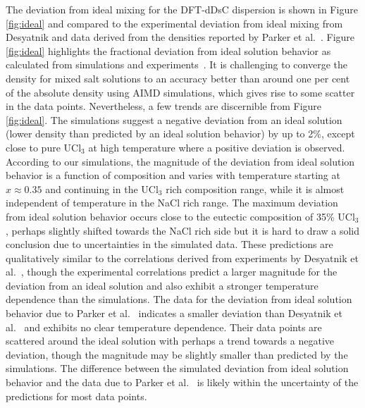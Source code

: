 \documentclass[preprint,3p,10pt,onecolumn,number,sort&compress]{elsarticle}
\begin{document}
{The deviation from ideal mixing for the DFT-dDsC dispersion is shown in Figure \ref{fig:ideal} and compared to the experimental deviation from ideal mixing from Desyatnik \cite{Desyatnik} and data derived from the densities reported by Parker et al.~\cite{Parker}. Figure \ref{fig:ideal} highlights the fractional deviation from ideal solution behavior as calculated from simulations and experiments~\cite{agca2022,Desyatnik}. It is challenging to converge the density for mixed salt solutions to an accuracy better than around one per cent of the absolute density using AIMD simulations, which gives rise to some scatter in the data points. Nevertheless, a few trends are discernible from Figure \ref{fig:ideal}. The simulations suggest a negative deviation from an ideal solution (lower density than predicted by an ideal solution behavior) by up to 2\%, except close to pure UCl$_3$ at high temperature where a positive deviation is observed. According to our simulations, the magnitude of the deviation from ideal solution behavior is a function of composition and varies with temperature starting at $x\approx0.35$ and continuing in the UCl$_3$ rich composition range, while it is almost independent of temperature in the NaCl rich range. 
The maximum deviation from ideal solution behavior occurs close to the eutectic composition of 35\% UCl$_3$, perhaps slightly shifted towards the NaCl rich side but it is hard to draw a solid conclusion due to uncertainties in the simulated data. These predictions are qualitatively similar to the correlations derived from experiments by Desyatnik et al.~\cite{Desyatnik}, though the experimental correlations predict a larger magnitude for the deviation from an ideal solution and also exhibit a stronger temperature dependence than the simulations. The data for the deviation from ideal solution behavior due to Parker et al.~\cite{Parker} indicates a smaller deviation than Desyatnik et al.~\cite{Desyatnik} and exhibits no clear temperature dependence. Their data points are scattered around the ideal solution with perhaps a trend towards a negative deviation, though the magnitude may be slightly smaller than predicted by the simulations. The difference between the simulated deviation from ideal solution behavior and the data due to Parker et al.~\cite{Parker} is likely within the uncertainty of the predictions for most data points. 

}
\end{document}
